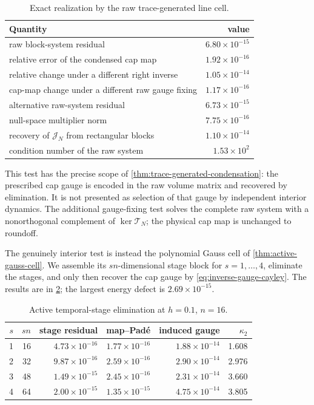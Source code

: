 \documentclass[11pt,a4paper]{article}
\begin{document}
\begin{table}[H]
\centering
\caption{Exact realization by the raw trace-generated line cell.}
\label{tab:dynamic-condensation}
\begin{tabular}{@{}lr@{}}
\toprule
Quantity & value \\ \midrule
raw block-system residual & \(6.80\times10^{-15}\)\\
relative error of the condensed cap map & \(1.92\times10^{-16}\)\\
relative change under a different right inverse & \(1.05\times10^{-14}\)\\
cap-map change under a different raw gauge fixing & \(1.17\times10^{-16}\)\\
alternative raw-system residual & \(6.73\times10^{-15}\)\\
null-space multiplier norm & \(7.75\times10^{-16}\)\\
recovery of \(\mathcal J_N\) from rectangular blocks & \(1.10\times10^{-14}\)\\
condition number of the raw system & \(1.53\times10^{2}\)\\
\bottomrule
\end{tabular}
\end{table}

This test has the precise scope of
\cref{thm:trace-generated-condensation}: the prescribed cap gauge is
encoded in the raw volume matrix and recovered by elimination.  It is not
presented as selection of that gauge by independent interior dynamics.
The additional gauge-fixing test solves the complete raw system with a
nonorthogonal complement of \(\ker\mathcal T_N\); the physical cap map is
unchanged to roundoff.

The genuinely interior test is instead the polynomial Gauss cell of
\cref{thm:active-gauss-cell}.  We assemble its \(sn\)-dimensional stage
block for \(s=1,\ldots,4\), eliminate the stages, and only then recover the
cap gauge by \cref{eq:inverse-gauge-cayley}.  The results are in
\cref{tab:active-stage-condensation}; the largest energy defect is
\(2.69\times10^{-15}\).

\begin{table}[H]
\centering
\small
\caption{Active temporal-stage elimination at \(h=0.1\), \(n=16\).}
\label{tab:active-stage-condensation}
\begin{tabular}{@{}rrrrrr@{}}
\toprule
\(s\) & \(sn\) & stage residual & map--Pad\'e & induced gauge & \(\kappa_2\)\\
\midrule
1 & 16 & \(4.73\times10^{-16}\) & \(1.77\times10^{-16}\)
  & \(1.88\times10^{-14}\) & 1.608\\
2 & 32 & \(9.87\times10^{-16}\) & \(2.59\times10^{-16}\)
  & \(2.90\times10^{-14}\) & 2.976\\
3 & 48 & \(1.49\times10^{-15}\) & \(2.45\times10^{-16}\)
  & \(2.31\times10^{-14}\) & 3.660\\
4 & 64 & \(2.00\times10^{-15}\) & \(1.35\times10^{-15}\)
  & \(4.75\times10^{-14}\) & 3.805\\
\bottomrule
\end{tabular}
\end{table}
\end{document}
